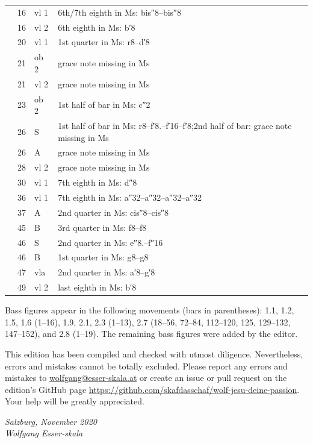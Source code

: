 \documentclass[parskip=full]{scrreprt}
\begin{document}
\begin{longtable}{lll L{10cm}}
	     & 16  & vl 1    & 6th/7th eighth in Ms: bis″8–bis″8 \\
	     & 16  & vl 2    & 6th eighth in Ms: b′8 \\
	     & 20  & vl 1    & 1st quarter in Ms: r8–d′8 \\
	     & 21  & ob 2    & grace note missing in Ms \\
	     & 21  & vl 2    & grace note missing in Ms \\
	     & 23  & ob 2    & 1st half of bar in Ms: c″2 \\
	     & 26  & S       & 1st half of bar in Ms: r8–f′8.–f′16–f′8;\newline 2nd half of bar: grace note missing in Ms \\
	     & 26  & A       & grace note missing in Ms \\
	     & 28  & vl 2    & grace note missing in Ms \\
	     & 30  & vl 1    & 7th eighth in Ms: d″8 \\
	     & 36  & vl 1    & 7th eighth in Ms: a″32–a″32–a″32–a″32 \\
	     & 37  & A       & 2nd quarter in Ms: cis″8–cis″8 \\
	     & 45  & B       & 3rd quarter in Ms: f8–f8 \\
	     & 46  & S       & 2nd quarter in Ms: e″8.–f″16 \\
	     & 46  & B       & 1st quarter in Ms: g8–g8 \\
	     & 47  & vla     & 2nd quarter in Ms: a′8–g′8 \\
	     & 49  & vl 2    & last eighth in Ms: b′8 \\
	\bottomrule
\end{longtable}

Bass figures appear in the following movements (bars in parentheses): 1.1, 1.2, 1.5, 1.6 (1–16), 1.9, 2.1, 2.3 (1–13), 2.7 (18–56, 72–84, 112–120, 125, 129–132, 147–152), and 2.8 (1–19). The remaining bass figures were added by the editor.

This edition has been compiled and checked with utmost diligence. Nevertheless, errors and mistakes cannot be totally excluded. Please report any errors and mistakes to \url{wolfgang@esser-skala.at} or create an issue or pull request on the edition’s GitHub page \url{https://github.com/skafdasschaf/wolf-jesu-deine-passion}. Your help will be greatly appreciated.

\bigskip
\textit{Salzburg, November 2020\\
Wolfgang Esser-skala}
\end{document}
